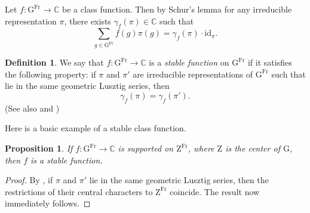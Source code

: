 \documentclass[12pt, reqno]{amsart}
\newtheorem{proposition}[theorem]{Proposition}
\theoremstyle{definition}
\newtheorem{definition}[theorem]{Definition}
\theoremstyle{definition}
\theoremstyle{definition}
\newcommand{\cComplex}{\mathbb{C}}
\newcommand{\idmap}{\mathrm{id}}
\newcommand{\finiteField}{\mathbb{F}}
\newcommand{\Frobenius}{\operatorname{Fr}}
\newcommand{\algebraicGroup}[1]{\boldsymbol{\mathrm{#1}}}
\begin{document}
Let $f \colon \algebraicGroup{G}^{\Frobenius} \to \cComplex$ be a class function. Then by Schur's lemma for any irreducible representation $\pi$, there exists $\gamma_{f}\left(\pi\right) \in \cComplex$ such that $$\sum_{g \in \algebraicGroup{G}^{\Frobenius}} f(g)\pi(g) = \gamma_{f}\left(\pi\right) \cdot \idmap_{\pi}.$$

\begin{definition}
	We say that  $f \colon \algebraicGroup{G}^{\Frobenius} \to \cComplex$ is a \emph{stable function} on $\algebraicGroup{G}^{\Frobenius}$ if it satisfies the following property: if $\pi$ and $\pi'$ are irreducible representations of $\algebraicGroup{G}^{\Frobenius}$ such that lie in the same geometric Lusztig series, then $$\gamma_{f}\left(\pi\right) = \gamma_{f}\left(\pi'\right).$$
(See also \cite[Section 4]{LaumonLetellier2023} and \cite[Section 4.1]{ChenBhattacharya2024})
	\end{definition}


Here is a basic example of a stable class function.
\begin{proposition}
\label{prop:central_char}
If $f \colon \algebraicGroup{G}^{\Frobenius} \to \cComplex$ is supported on $\algebraicGroup{Z}^{\Frobenius}$, where $\algebraicGroup{Z}$ is the center of $\algebraicGroup{G}$, then $f$ is a stable function.
\end{proposition}
\begin{proof}
By \cite[Lemma 2.2]{Malle2007}, if $\pi$ and $\pi'$ lie in the same geometric Lusztig series, then the restrictions of their central characters to $\algebraicGroup{Z}^{\Frobenius}$ coincide. The result now immediately follows.
\end{proof}
\begin{comment}
\begin{proof}
The Deligne Lusztig variety is a subset of the group, for any $z \in \algebraicGroup{Z}(\finiteField)$ we can move the action of $z \in algebraicGroup{G}(\finiteField)$ to the action of $z \in \algebraicGroup{T}(\finiteField)$
Thus it suffices to show that $\theta|_{\algebraicGroup{Z}(\finiteField))} = \theta'|_{\algebraicGroup{Z}(\finiteField)}$
But this follows from geometric conjugacy: for large enough $n$, $\theta \circ \fieldNorm{n}{1}|_{\algebraicGroup{Z}(\finiteField))} = \theta'\circ \fieldNorm{n}{1}|_{\algebraicGroup{Z}(\finiteField)}$
and the Norm map is surjective.
\end{proof}
\end{comment}
\end{document}
